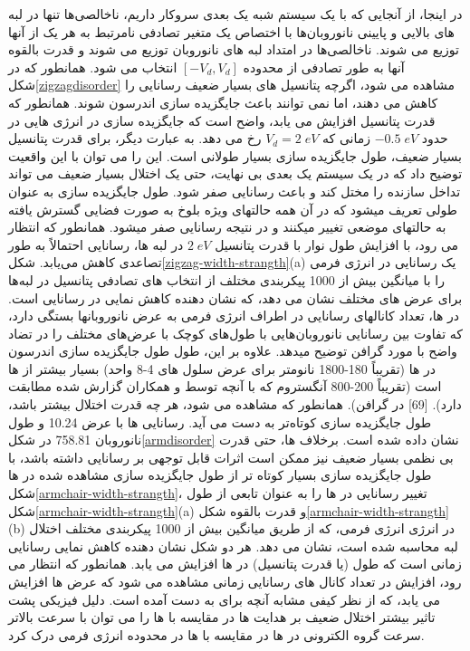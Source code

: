 در اینجا، از آنجایی که با یک سیستم شبه یک بعدی سروکار داریم، ناخالصی‌ها تنها در لبه های بالایی و پایینی نانوروبان‌ها با اختصاص یک متغیر تصادفی نامرتبط به هر یک از آنها توزیع می شوند. ناخالصی‌ها در امتداد لبه های نانوروبان توزیع می شوند و قدرت بالقوه آنها به طور تصادفی از محدوده $[-V_d, V_d]$ انتخاب می شود. همانطور که در شکل\ref{zigzagdisorder} مشاهده می شود، اگرچه پتانسیل های بسیار ضعیف رسانایی را کاهش می دهند، اما نمی توانند باعث جایگزیده سازی اندرسون شوند. همانطور که قدرت پتانسیل افزایش می یابد، واضح است که جایگزیده سازی در انرژی هایی در حدود $-0.5\;eV$ زمانی که $V_d = 2\;eV$ رخ می دهد. به عبارت دیگر، برای قدرت پتانسیل بسیار ضعیف، طول جایگزیده سازی بسیار طولانی است. این را می توان با این واقعیت توضیح داد که در یک سیستم یک بعدی بی نهایت، حتی یک اختلال بسیار ضعیف می تواند تداخل سازنده را مختل کند و باعث رسانایی صفر شود. طول جایگزیده سازی به عنوان طولی تعریف میشود که در آن همه حالتهای ویژه بلوخ به صورت فضایی گسترش یافته به حالتهای موضعی تغییر میکنند و در نتیجه رسانایی صفر میشود. همانطور که انتظار می رود، با افزایش طول نوار با قدرت پتانسیل $2 \;eV$ در لبه ها، رسانایی احتمالاً به طور تصاعدی کاهش می‌یابد. شکل\ref{zigzag-width-strangth}(a) یک رسانایی در انرژی فرمی را با میانگین بیش از 1000 پیکربندی مختلف از انتخاب های تصادفی پتانسیل در لبه‌ها برای عرض های مختلف  نشان می دهد، که نشان دهنده کاهش نمایی در رسانایی است. در ها، تعداد کانالهای رسانایی در اطراف انرژی فرمی به عرض نانوروبانها بستگی دارد، که تفاوت بین رسانایی نانوروبان‌ها‌یی با طول‌های کوچک با عرض‌های مختلف را در تضاد واضح با مورد گرافن توضیح میدهد. علاوه بر این، طول طول جایگزیده سازی اندرسون در  ها (تقریباً 180-1800 نانومتر برای عرض سلول های 4-8 واحد) بسیار بیشتر از ها است (تقریباً 200-800 آنگستروم که با آنچه توسط  و همکاران گزارش شده مطابقت دارد). [69] در گرافن). همانطور که مشاهده می شود، هر چه قدرت اختلال بیشتر باشد، طول جایگزیده سازی کوتاه‌تر به دست می آید. رسانایی  ها با عرض \lr{\AA} 10.24 و طول نانوروبان \lr{\AA} 758.81 در شکل\ref{armdisorder} نشان داده شده است. برخلاف  ها، حتی قدرت بی نظمی بسیار ضعیف نیز ممکن است اثرات قابل توجهی بر رسانایی داشته باشد، با طول جایگزیده سازی بسیار کوتاه تر از طول جایگزیده سازی مشاهده شده در  ها شکل\ref{armchair-width-strangth}، تغییر رسانایی در ها را به عنوان تابعی از طول شکل\ref{armchair-width-strangth}(a) و قدرت بالقوه شکل\ref{armchair-width-strangth}(b) در انرژی انرژی فرمی، که از طریق میانگین بیش از 1000 پیکربندی مختلف اختلال لبه محاسبه شده است، نشان می دهد. هر دو شکل نشان دهنده کاهش نمایی رسانایی زمانی است که طول (یا قدرت پتانسیل) در  ها افزایش می یابد. همانطور که انتظار می رود، افزایش در تعداد کانال های رسانایی زمانی مشاهده می شود که عرض  ها افزایش می یابد، که از نظر کیفی مشابه آنچه برای  به دست آمده است. دلیل فیزیکی پشت تاثیر بیشتر اختلال ضعیف بر هدایت  ها در مقایسه با  ها را می توان با سرعت بالاتر سرعت گروه الکترونی در  ها در مقایسه با  ها در محدوده انرژی فرمی درک کرد.

